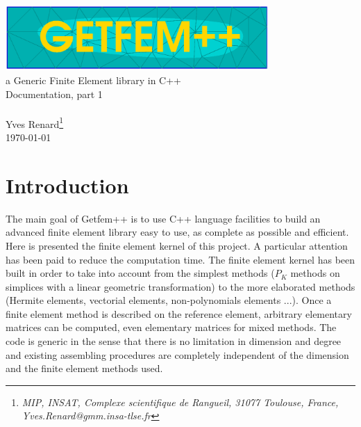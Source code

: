 \documentclass[11pt,a4paper]{article}
\begin{document}
\begin{center}
  \includegraphics[width=10cm,angle=0]{getfem_logo.eps}\\[0.2cm]
  a Generic Finite Element library in C++ \\[0.5cm]
  {\LARGE Documentation, part \Huge 1} \\[0.5cm]
   \\[0.5cm]
  { \large Yves \sc Renard\footnote{ \it MIP, INSAT, Complexe scientifique de Rangueil, 31077 Toulouse, France, Yves.Renard@gmm.insa-tlse.fr } } \\[1.0cm]
      \today \\[1.0cm]
\end{center}




\section*{Introduction}
The main goal of {\sc Getfem++} is to use C++ language facilities to build an advanced finite element library easy to use, as complete as possible and efficient. Here is presented the finite element kernel of this project. A particular attention has been paid to reduce the computation time. The finite element kernel has been built in order to take into account from the simplest methods ($P_K$ methods on simplices with a linear geometric transformation) to the more elaborated methods (Hermite elements, vectorial elements, non-polynomials elements ...). Once a finite element method is described on the reference element, arbitrary elementary  matrices can be computed, even elementary matrices for mixed methods. The code is generic in the sense that there is no limitation in dimension and degree and existing assembling procedures are completely independent of the dimension and the finite element methods used.\\[2.4cm]

\end{document}
